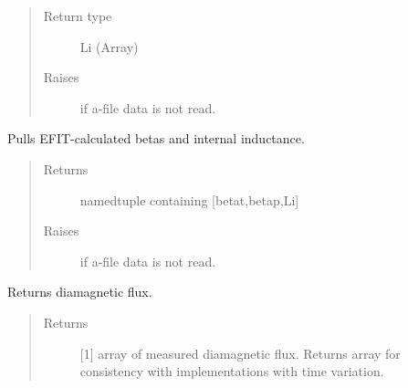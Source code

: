 \documentclass[letterpaper,10pt,english]{sphinxmanual}
\begin{document}
\begin{fulllineitems}
\begin{fulllineitems}
\begin{quote}
\begin{description}
\item[{Return type}] \leavevmode
Li (Array)

\item[{Raises}] \leavevmode
{} \textendash{} if a-file data is not read.

\end{description}\end{quote}

\end{fulllineitems}


\begin{fulllineitems}
\label{\detokenize{eqtools:eqtools.eqdskreader.EqdskReader.getBetas}}
Pulls EFIT-calculated betas and internal inductance.
\begin{quote}\begin{description}
\item[{Returns}] \leavevmode
namedtuple containing {[}betat,betap,Li{]}

\item[{Raises}] \leavevmode
{} \textendash{} if a-file data is not read.

\end{description}\end{quote}

\end{fulllineitems}


\begin{fulllineitems}
\label{\detokenize{eqtools:eqtools.eqdskreader.EqdskReader.getDiamagFlux}}
Returns diamagnetic flux.
\begin{quote}\begin{description}
\item[{Returns}] \leavevmode
{[}1{]} array of measured diamagnetic flux.  Returns array
for consistency with
{\hyperref[\detokenize{eqtools:eqtools.core.Equilibrium}]{}}
implementations with time variation.


\end{description}
\end{quote}
\end{fulllineitems}
\end{fulllineitems}
\end{document}
